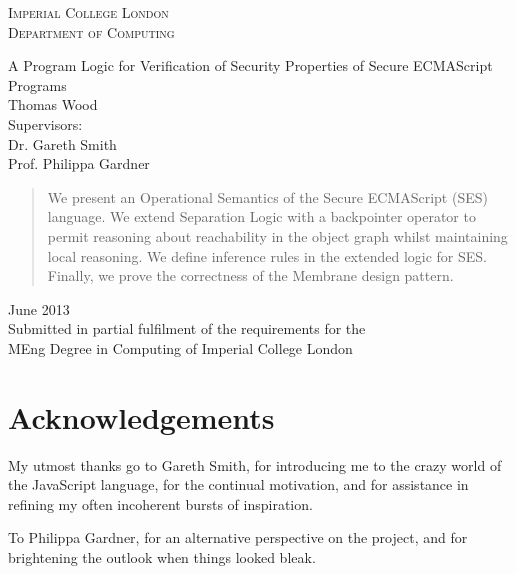 \documentclass[a4paper,notitlepage]{report}
\begin{document}
\begin{titlepage}
\begin{center}
  \textsc{\large Imperial College London} \\[0.1cm]
  \textsc{\large Department of Computing}

  \vfill

  {\LARGE A Program Logic for Verification of Security Properties of Secure
  ECMAScript Programs} \\[1cm]

  {\Large Thomas Wood} \\[1cm]

  {\large Supervisors:\\
  Dr. Gareth Smith \\
  Prof. Philippa Gardner}
  \\[2cm]

  \begin{abstract}
    \begin{center}
      We present an Operational Semantics of the Secure ECMAScript (SES) language.
      We extend Separation Logic with a backpointer operator to permit reasoning
      about reachability in the object graph whilst maintaining local reasoning.
      We define inference rules in the extended logic for SES. Finally, we prove
      the correctness of the Membrane design pattern.
    \end{center}
  \end{abstract}

  \vfill

  {\Large June 2013} \\[0.5cm]

  Submitted in partial fulfilment of the requirements for the\\
  MEng Degree in Computing of Imperial College London
\end{center}
\end{titlepage}

\chapter*{Acknowledgements}
  My utmost thanks go to Gareth Smith, for introducing me to the crazy world of
  the JavaScript language, for the continual motivation, and for assistance in
  refining my often incoherent bursts of inspiration.

  To Philippa Gardner, for an alternative perspective on the project, and for
  brightening the outlook when things looked bleak.
\end{document}
